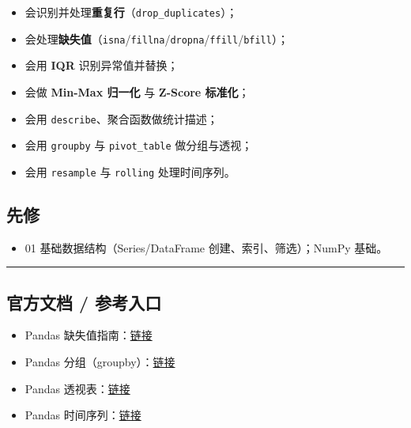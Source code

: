 \begin{itemize}
\tightlist
\item
  会识别并处理\textbf{重复行}（\texttt{drop\_duplicates}）；
\item
  会处理\textbf{缺失值}（\texttt{isna}/\texttt{fillna}/\texttt{dropna}/\texttt{ffill}/\texttt{bfill}）；
\item
  会用 \textbf{IQR} 识别异常值并替换；
\item
  会做 \textbf{Min-Max 归一化} 与 \textbf{Z-Score 标准化}；
\item
  会用 \texttt{describe}、聚合函数做统计描述；
\item
  会用 \texttt{groupby} 与 \texttt{pivot\_table} 做分组与透视；
\item
  会用 \texttt{resample} 与 \texttt{rolling} 处理时间序列。
\end{itemize}

\subsection{先修}\label{ux5148ux4fee-12}

\begin{itemize}
\tightlist
\item
  01 基础数据结构（Series/DataFrame 创建、索引、筛选）；NumPy 基础。
\end{itemize}

\begin{center}\rule{0.5\linewidth}{0.5pt}\end{center}

\subsection{官方文档 /
参考入口}\label{ux5b98ux65b9ux6587ux6863-ux53c2ux8003ux5165ux53e3-6}

\begin{itemize}
\tightlist
\item
  Pandas
  缺失值指南：\href{https://pandas.pydata.org/docs/user_guide/missing_data.html}{链接}
\item
  Pandas
  分组（groupby）：\href{https://pandas.pydata.org/docs/user_guide/groupby.html}{链接}
\item
  Pandas
  透视表：\href{https://pandas.pydata.org/docs/reference/api/pandas.pivot_table.html}{链接}
\item
  Pandas
  时间序列：\href{https://pandas.pydata.org/docs/user_guide/timeseries.html}{链接}
\end{itemize}

